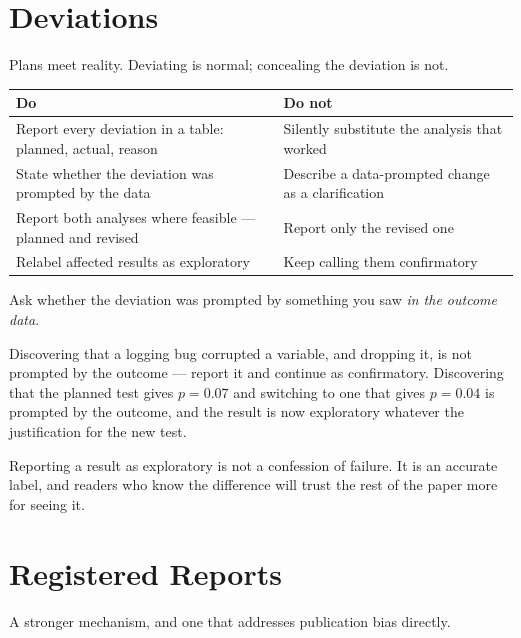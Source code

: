 \section{Deviations}

Plans meet reality. Deviating is normal; concealing the deviation is not.

\begin{center}
\small
\begin{tabular}{@{}L{4.0cm}L{10.3cm}@{}}
\toprule
\textbf{Do} & \textbf{Do not} \\
\midrule
Report every deviation in a table: planned, actual, reason
  & Silently substitute the analysis that worked \\
State whether the deviation was prompted by the data
  & Describe a data-prompted change as a clarification \\
Report both analyses where feasible --- planned and revised
  & Report only the revised one \\
Relabel affected results as exploratory
  & Keep calling them confirmatory \\
\bottomrule
\end{tabular}
\end{center}

\begin{conceptbox}
Ask whether the deviation was prompted by something you saw \emph{in the
outcome data}.

\medskip
Discovering that a logging bug corrupted a variable, and dropping it, is not
prompted by the outcome --- report it and continue as confirmatory. Discovering
that the planned test gives $p = 0.07$ and switching to one that gives $p =
0.04$ is prompted by the outcome, and the result is now exploratory whatever
the justification for the new test.

\medskip
Reporting a result as exploratory is not a confession of failure. It is an
accurate label, and readers who know the difference will trust the rest of the
paper more for seeing it.
\end{conceptbox}

\section{Registered Reports}

A stronger mechanism, and one that addresses publication bias directly.

